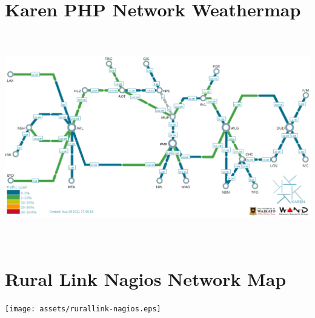 \documentclass[11pt, a4paper]{article}
\begin{document}
\newpage





\newpage

\appendix
\appendixpage

\section{Karen PHP Network Weathermap}
\label{app:karenphp}
\centering
\includegraphics[width=170mm,height=90.76mm]{assets/karen-phpweathermap.eps}

\newpage

\section{Rural Link Nagios Network Map}
\label{app:crcnetnagios}
\centering
\texttt{[image: assets/rurallink-nagios.eps]}
\end{document}
